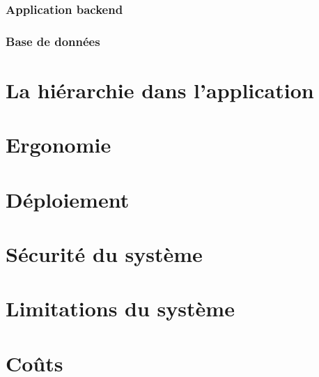         \subsubsection{Application backend}
        \subsubsection{Base de données}
        \section{La hiérarchie dans l'application}
        \lipsum[1]
        \section{Ergonomie}
        \lipsum[1]
        \section{Déploiement}
        \lipsum[1]
        \section{Sécurité du système}
        \lipsum[1]
        \section{Limitations du système}
        \lipsum[1]
        \section{Coûts}
        \lipsum[1]
    
